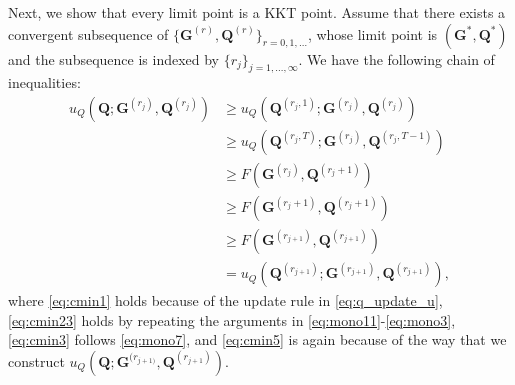 \documentclass[10pt,journal]{IEEEtran}
\begin{document}
\bigskip

Next, we show that every limit point is a KKT point.
Assume that there exists a convergent subsequence of $\{{\bm G}^{(r)},{\bm Q}^{(r)}\}_{r=0,1,\ldots}$,
whose limit point is $({\bm G}^\ast,{\bm Q}^\ast)$ and the subsequence is indexed by $\{r_j\}_{j=1,\ldots,\infty}$.
We have the following chain of inequalities:
\begin{subequations}\label{eq:u_Q}
\begin{align}
         u_Q\left({\bm Q};{\bm G}^{(r_j)},{\bm Q}^{(r_j)}\right) &\geq u_Q\left({\bm Q}^{(r_j,1)};{\bm G}^{(r_j)},{\bm Q}^{(r_j)}\right) \label{eq:cmin1}\\
				                               &\geq u_Q\left({\bm Q}^{(r_j,T)};{\bm G}^{(r_j)},{\bm Q}^{(r_j,T-1)}\right) \label{eq:cmin23}\\
				                              &\geq F({\bm G}^{(r_j)},{\bm Q}^{(r_j+1)})\label{eq:cmin24}\\					
                                               &\geq F\left({\bm G}^{(r_j+1)},{\bm Q}^{(r_j+1)}\right)  \label{eq:cmin3}\\
											  &\geq F\left({\bm G}^{(r_{j+1})},{\bm Q}^{(r_{j+1})}\right)  \label{eq:cmin4}\\
											   & = u_Q\left({\bm Q}^{(r_{j+1})};{\bm G}^{(r_{j+1})},{\bm Q}^{(r_{j+1})}\right), \label{eq:cmin5}
\end{align}
\end{subequations}
where \eqref{eq:cmin1} holds because of the update rule in \eqref{eq:q_update_u},
\eqref{eq:cmin23} holds by repeating the arguments in \eqref{eq:mono11}-\eqref{eq:mono3},
\eqref{eq:cmin3} follows \eqref{eq:mono7},
and \eqref{eq:cmin5} is again because of the way that we construct $u_Q({\bm Q};{\bm G}^{(r_{j+1)}},{\bm Q}^{(r_{j+1})})$.

\end{document}
